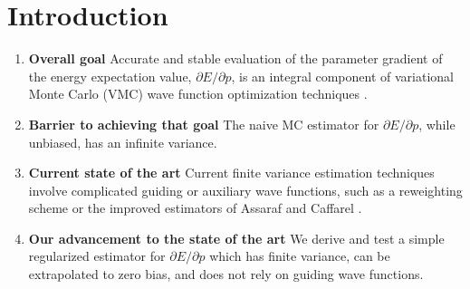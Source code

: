\documentclass{article}
\begin{document}
\section{Introduction}
\begin{enumerate}
\item \textbf{Overall goal } Accurate and stable evaluation of the parameter gradient of the energy expectation value, $\partial E/\partial p$, is an integral component of variational Monte Carlo (VMC) wave function optimization techniques \cite{PhysRevB.64.024512, doi:10.1063/1.1604379, Toulouse2007}.

\item \textbf{Barrier to achieving that goal } The naive MC estimator for $\partial E/\partial p$, while unbiased, has an infinite variance.

\item \textbf{Current state of the art} Current finite variance estimation techniques involve complicated guiding or auxiliary wave functions, such as a reweighting scheme \cite{Attaccalite2008, Avella} or the improved estimators of Assaraf and Caffarel \cite{doi:10.1063/1.1286598, Assaraf2003}.

\item \textbf{Our advancement to the state of the art } We derive and test a simple regularized estimator for $\partial E/\partial p$ which has finite variance, can be extrapolated to zero bias, and does not rely on guiding wave functions.
\end{enumerate}
\end{document}
